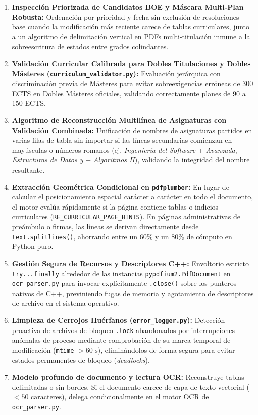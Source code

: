 \begin{itemize}
\begin{enumerate}
        \item \textbf{Inspección Priorizada de Candidatos BOE y Máscara Multi-Plan Robusta:} Ordenación por prioridad y fecha sin exclusión de resoluciones base cuando la modificación más reciente carece de tablas curriculares, junto a un algoritmo de delimitación vertical en PDFs multi-titulación inmune a la sobreescritura de estados entre grados colindantes.
        \item \textbf{Validación Curricular Calibrada para Dobles Titulaciones y Dobles Másteres (\texttt{curriculum\_validator.py}):} Evaluación jerárquica con discriminación previa de Másteres para evitar sobreexigencias erróneas de 300 ECTS en Dobles Másteres oficiales, validando correctamente planes de 90 a 150 ECTS.
        \item \textbf{Algoritmo de Reconstrucción Multilínea de Asignaturas con Validación Combinada:} Unificación de nombres de asignaturas partidos en varias filas de tabla sin importar si las líneas secundarias comienzan en mayúsculas o números romanos (ej. \emph{Ingeniería del Software} + \emph{Avanzada}, \emph{Estructuras de Datos y} + \emph{Algoritmos II}), validando la integridad del nombre resultante.
        \item \textbf{Extracción Geométrica Condicional en \texttt{pdfplumber}:} En lugar de calcular el posicionamiento espacial carácter a carácter en todo el documento, el motor evalúa rápidamente si la página contiene tablas o indicios curriculares (\texttt{RE\_CURRICULAR\_PAGE\_HINTS}). En páginas administrativas de preámbulo o firmas, las líneas se derivan directamente desde \texttt{text.splitlines()}, ahorrando entre un 60\% y un 80\% de cómputo en Python puro.
        \item \textbf{Gestión Segura de Recursos y Descriptores C++:} Envoltorio estricto \texttt{try...finally} alrededor de las instancias \texttt{pypdfium2.PdfDocument} en \texttt{ocr\_parser.py} para invocar explícitamente \texttt{.close()} sobre los punteros nativos de C++, previniendo fugas de memoria y agotamiento de descriptores de archivo en el sistema operativo.
        \item \textbf{Limpieza de Cerrojos Huérfanos (\texttt{error\_logger.py}):} Detección proactiva de archivos de bloqueo \texttt{.lock} abandonados por interrupciones anómalas de proceso mediante comprobación de su marca temporal de modificación (\texttt{mtime} $> 60\text{ s}$), eliminándolos de forma segura para evitar estados permanentes de bloqueo (\emph{deadlocks}).
        \item \textbf{Modelo profundo de documento y lectura OCR:} Reconstruye tablas delimitadas o sin bordes. Si el documento carece de capa de texto vectorial ($< 50\text{ caracteres}$), delega condicionalmente en el motor OCR de \texttt{ocr\_parser.py}.

\end{enumerate}
\end{itemize}
